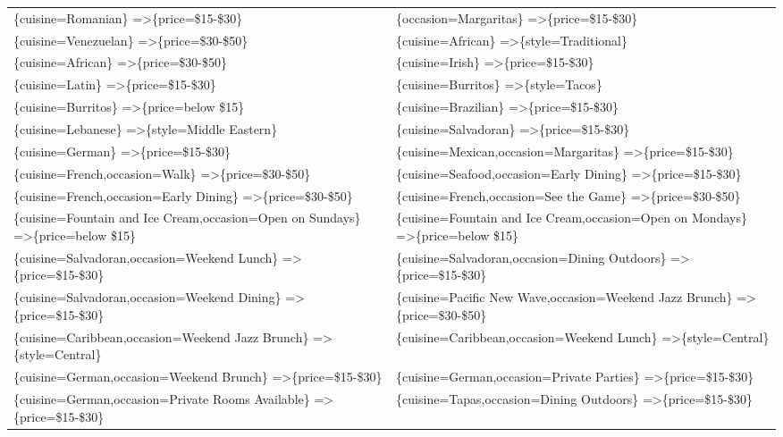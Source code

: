\documentclass[letterpaper,10pt]{article}
\begin{document}
\begin{appendices}
\begin{table}[h]
\begin{adjustbox}{max width=\textwidth}
\begin{tabular}{ll}
\{cuisine=Romanian\} =\textgreater \{price=\$15-\$30\} & \{occasion=Margaritas\} =\textgreater \{price=\$15-\$30\} \\ 
\{cuisine=Venezuelan\} =\textgreater \{price=\$30-\$50\} & \{cuisine=African\} =\textgreater \{style=Traditional\} \\ 
\{cuisine=African\} =\textgreater \{price=\$30-\$50\} & \{cuisine=Irish\} =\textgreater \{price=\$15-\$30\} \\ 
\{cuisine=Latin\} =\textgreater \{price=\$15-\$30\} & \{cuisine=Burritos\} =\textgreater \{style=Tacos\} \\ 
\{cuisine=Burritos\} =\textgreater \{price=below \$15\} & \{cuisine=Brazilian\} =\textgreater \{price=\$15-\$30\} \\ 
\{cuisine=Lebanese\} =\textgreater \{style=Middle Eastern\} & \{cuisine=Salvadoran\} =\textgreater \{price=\$15-\$30\} \\ 
\{cuisine=German\} =\textgreater \{price=\$15-\$30\} & \{cuisine=Mexican,occasion=Margaritas\} =\textgreater \{price=\$15-\$30\} \\ 
\{cuisine=French,occasion=Walk\} =\textgreater \{price=\$30-\$50\} & \{cuisine=Seafood,occasion=Early Dining\} =\textgreater \{price=\$15-\$30\} \\ 
\{cuisine=French,occasion=Early Dining\} =\textgreater \{price=\$30-\$50\} & \{cuisine=French,occasion=See the Game\} =\textgreater \{price=\$30-\$50\} \\ 
\{cuisine=Fountain and Ice Cream,occasion=Open on Sundays\} =\textgreater \{price=below \$15\} & \{cuisine=Fountain and Ice Cream,occasion=Open on Mondays\} =\textgreater \{price=below \$15\} \\ 
\{cuisine=Salvadoran,occasion=Weekend Lunch\} =\textgreater \{price=\$15-\$30\} & \{cuisine=Salvadoran,occasion=Dining Outdoors\} =\textgreater \{price=\$15-\$30\} \\ 
\{cuisine=Salvadoran,occasion=Weekend Dining\} =\textgreater \{price=\$15-\$30\} & \{cuisine=Pacific New Wave,occasion=Weekend Jazz Brunch\} =\textgreater \{price=\$30-\$50\} \\ 
\{cuisine=Caribbean,occasion=Weekend Jazz Brunch\} =\textgreater \{style=Central\} & \{cuisine=Caribbean,occasion=Weekend Lunch\} =\textgreater \{style=Central\} \\ 
\{cuisine=German,occasion=Weekend Brunch\} =\textgreater \{price=\$15-\$30\} & \{cuisine=German,occasion=Private Parties\} =\textgreater \{price=\$15-\$30\} \\ 
\{cuisine=German,occasion=Private Rooms Available\} =\textgreater \{price=\$15-\$30\} & \{cuisine=Tapas,occasion=Dining Outdoors\} =\textgreater \{price=\$15-\$30\} \\ 

\end{tabular}
\end{adjustbox}
\end{table}
\end{appendices}
\end{document}
